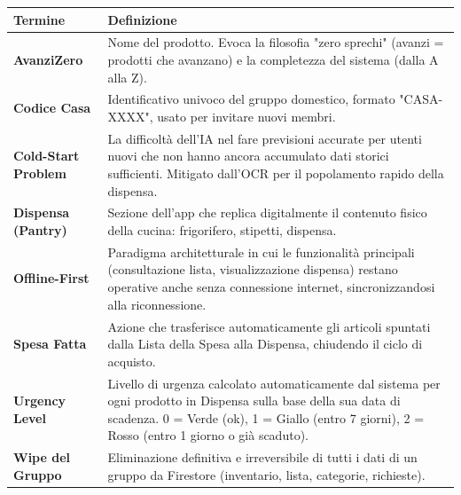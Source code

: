 \documentclass[12pt,a4paper]{article}
\begin{document}
\begin{table}[h]
\centering
\begin{tabularx}{\textwidth}{|l|X|}
\hline
\textbf{Termine} & \textbf{Definizione} \\
\hline
\textbf{AvanziZero} & Nome del prodotto. Evoca la filosofia "zero sprechi" (avanzi = prodotti che avanzano) e la completezza del sistema (dalla A alla Z). \\
\hline
\textbf{Codice Casa} & Identificativo univoco del gruppo domestico, formato "CASA-XXXX", usato per invitare nuovi membri. \\
\hline
\textbf{Cold-Start Problem} & La difficoltà dell'IA nel fare previsioni accurate per utenti nuovi che non hanno ancora accumulato dati storici sufficienti. Mitigato dall'OCR per il popolamento rapido della dispensa. \\
\hline
\textbf{Dispensa (Pantry)} & Sezione dell'app che replica digitalmente il contenuto fisico della cucina: frigorifero, stipetti, dispensa. \\
\hline
\textbf{Offline-First} & Paradigma architetturale in cui le funzionalità principali (consultazione lista, visualizzazione dispensa) restano operative anche senza connessione internet, sincronizzandosi alla riconnessione. \\
\hline
\textbf{Spesa Fatta} & Azione che trasferisce automaticamente gli articoli spuntati dalla Lista della Spesa alla Dispensa, chiudendo il ciclo di acquisto. \\
\hline
\textbf{Urgency Level} & Livello di urgenza calcolato automaticamente dal sistema per ogni prodotto in Dispensa sulla base della sua data di scadenza. 0 = Verde (ok), 1 = Giallo (entro 7 giorni), 2 = Rosso (entro 1 giorno o già scaduto). \\
\hline
\textbf{Wipe del Gruppo} & Eliminazione definitiva e irreversibile di tutti i dati di un gruppo da Firestore (inventario, lista, categorie, richieste). \\
\hline
\end{tabularx}
\end{table}
\end{document}
